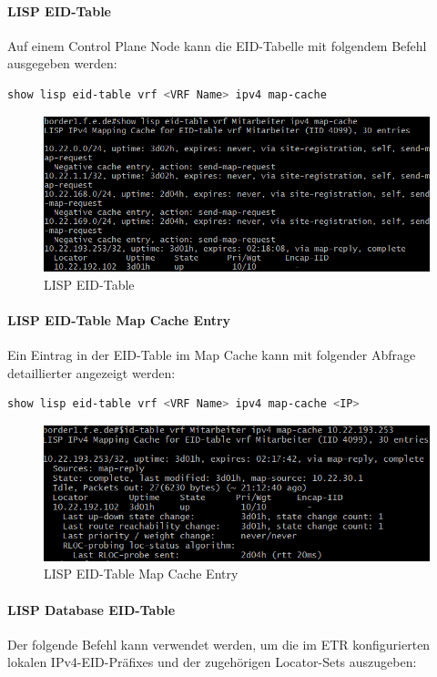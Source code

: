 \paragraph{LISP EID-Table}
Auf einem Control Plane Node kann die EID-Tabelle mit folgendem Befehl ausgegeben werden:

\begin{lstlisting}[language=bash]
show lisp eid-table vrf <VRF Name> ipv4 map-cache
\end{lstlisting}


\begin{figure}[H]
	\centering
	\includegraphics[width=0.8\linewidth]{img/Absicherung/lisp_eid-table}
	\caption{LISP EID-Table}
	\label{fig:LISP EID-Table}
\end{figure}


\paragraph{LISP EID-Table Map Cache Entry}
Ein Eintrag in der EID-Table im Map Cache kann mit folgender Abfrage detaillierter angezeigt werden:

\begin{lstlisting}[language=bash]
show lisp eid-table vrf <VRF Name> ipv4 map-cache <IP>
\end{lstlisting}


\begin{figure}[H]
	\centering
	\includegraphics[width=0.8\linewidth]{img/Absicherung/lisp_eid-table-entry}
	\caption{LISP EID-Table Map Cache Entry}
	\label{fig:LISP EID-Table Map Cache Entry}
\end{figure}


\paragraph{LISP Database EID-Table} \label{LISP Database EID-Table}
Der folgende Befehl kann verwendet werden, um die im ETR konfigurierten lokalen IPv4-EID-Präfixes und der zugehörigen Locator-Sets auszugeben:

